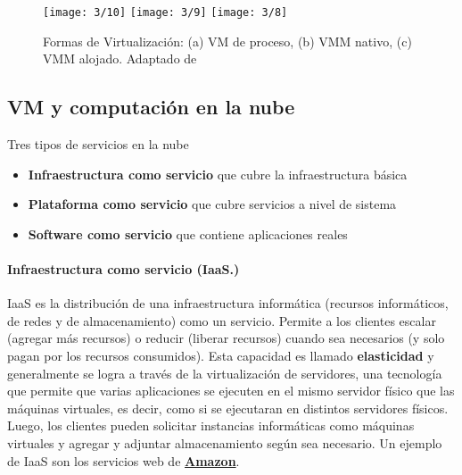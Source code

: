 		
		 \begin{figure} %
			\texttt{[image: 3/10]}
			\texttt{[image: 3/9]}
			\texttt{[image: 3/8]}
			\caption{Formas de Virtualización: (a) VM de proceso, (b) VMM nativo, (c) VMM alojado. Adaptado  de \ST }
			\label{fig:virtualizacion-tipo}
		\end{figure}
		

	
\subsection{ VM y computación en la nube }
		{Tres tipos de servicios en la nube 		 
			\begin{itemize} 	
				\item \textbf{Infraestructura como servicio} que cubre la infraestructura básica				
				\item \textbf{Plataforma como servicio} que cubre servicios a nivel de sistema 			
				\item  \textbf{Software como servicio} que contiene aplicaciones reales
			\end{itemize}
		

 
 \paragraph{Infraestructura como servicio (IaaS.)} IaaS es la distribución de una infraestructura informática  (recursos informáticos, de redes y de almacenamiento) como un servicio. Permite a los clientes escalar (agregar más recursos) o reducir (liberar recursos) cuando sea  necesarios (y solo pagan por los recursos consumidos). Esta  capacidad es  llamado \textbf{elasticidad} y generalmente se logra a través de la virtualización de servidores, una tecnología  que permite que varias aplicaciones se ejecuten en el mismo servidor físico que las máquinas virtuales, es decir, como si se ejecutaran en distintos servidores físicos. Luego, los clientes pueden solicitar instancias informáticas como máquinas virtuales y agregar y adjuntar almacenamiento según sea necesario. Un ejemplo de IaaS  son los servicios web de \textbf{\href{https://aws.amazon.com/es/}{Amazon}}. 
 
}
